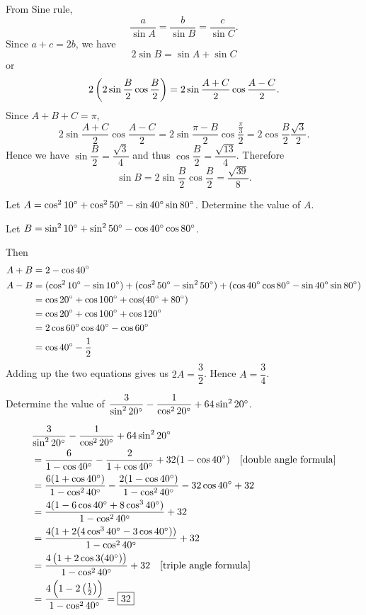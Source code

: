 \begin{solution}
From Sine rule,
\[ \frac{a}{\sin A}=\frac{b}{\sin B}=\frac{c}{\sin C}. \]
Since $a+c=2b$, we have
\[ 2\sin B=\sin A+\sin C \]
or
\[ 2\left(2\sin\frac{B}{2}\cos\frac{B}{2}\right)=2\sin\frac{A+C}{2}\cos\frac{A-C}{2}. \]
Since $A+B+C=\pi$,
\[ 2\sin\frac{A+C}{2}\cos\frac{A-C}{2}=2\sin\frac{\pi-B}{2}\cos\frac{\frac{\pi}{3}}{2}=2\cos\frac{B}{2}\frac{\sqrt{3}}{2}. \]
Hence we have $\sin\dfrac{B}{2}=\dfrac{\sqrt{3}}{4}$ and thus $\cos\dfrac{B}{2}=\dfrac{\sqrt{13}}{4}$. Therefore
\[ \sin B=2\sin\frac{B}{2}\cos\frac{B}{2}=\boxed{\frac{\sqrt{39}}{8}}. \]
\end{solution}

\begin{prbm}
Let $A = \cos^2 10\degree+\cos^2 50\degree-\sin40\degree\sin80\degree$. Determine the value of $A$.
\end{prbm}
\begin{solution}
Let $B=\sin^210\degree+\sin^250\degree-\cos40\degree\cos80\degree$.

Then
\begin{align*}
A+B &= 2-\cos40\degree \\
A-B &= (\cos^210\degree-\sin10\degree) + (\cos^250\degree-\sin^250\degree) + (\cos40\degree\cos80\degree-\sin40\degree\sin80\degree) \\
&= \cos20\degree + \cos100\degree + \cos(40\degree+80\degree) \\
&= \cos20\degree + \cos100\degree + \cos120\degree \\
&= 2\cos60\degree\cos40\degree-\cos60\degree \\
&= \cos40\degree-\frac{1}{2}
\end{align*}
Adding up the two equations gives us $2A=\dfrac{3}{2}$. Hence $\boxed{A=\dfrac{3}{4}}$.
\end{solution}

\begin{prbm}
Determine the value of $\dfrac{3}{\sin^220\degree}-\dfrac{1}{\cos^220\degree}+64\sin^220\degree$.
\end{prbm}

\begin{solution}
\begin{align*}
&\frac{3}{\sin^220\degree}-\frac{1}{\cos^220\degree}+64\sin^220\degree \\
&= \frac{6}{1-\cos40\degree}-\frac{2}{1+\cos40\degree}+32(1-\cos40\degree) \quad \text{[double angle formula]} \\
&= \frac{6(1+\cos40\degree)}{1-\cos^240\degree}-\frac{2(1-\cos40\degree)}{1-\cos^240\degree}-32\cos40\degree+32 \\
&= \frac{4(1-6\cos40\degree+8\cos^340\degree)}{1-\cos^240\degree}+32 \\
&= \frac{4(1+2(4\cos^340\degree-3\cos40\degree))}{1-\cos^240\degree}+32 \\
&= \frac{4\left(1+2\cos3(40\degree)\right)}{1-\cos^240\degree}+32 \quad \text{[triple angle formula]} \\
&=\frac{4\left(1-2\left(\frac{1}{2}\right)\right)}{1-\cos^240\degree}=\boxed{32}
\end{align*}
\end{solution}

